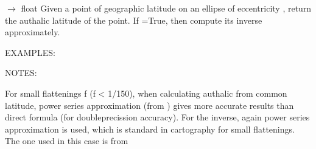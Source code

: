 \documentclass[a4paper,12ptopenany,oneside,english]{sphinxmanual}
\begin{document}
\begin{fulllineitems}
\label{\detokenize{utils:rhealpixdggs.utils.auth_lat}}
\pysigstartsignatures
\pysiglinewithargsret
{}
{\sphinxparamcomma {}\sphinxparamcomma {}\sphinxparamcomma {}}
{{ $\rightarrow$ float}}
\pysigstopsignatures
\sphinxAtStartPar
Given a point of geographic latitude  on an ellipse of
eccentricity , return the authalic latitude of the point.
If  =True, then compute its inverse approximately.

\sphinxAtStartPar
EXAMPLES:

\begin{sphinxVerbatim}[commandchars=\\\{\}]
    
 

    

 
\end{sphinxVerbatim}

\sphinxAtStartPar
NOTES:

\sphinxAtStartPar
For small flattenings f (f \textless{} 1/150), when calculating
authalic from common latitude, power series approximation
(from ) gives
more accurate results than direct formula (for
double\sphinxhyphen{}precission accuracy). For the inverse, again power
series approximation is used, which is standard in
cartography for small flattenings. The one used in this
case is from 

\end{fulllineitems}
\end{document}
